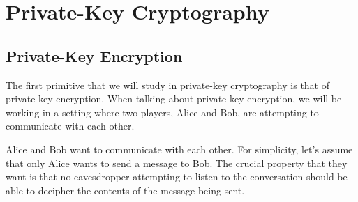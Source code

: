 \documentclass[12pt]{tufte-book}
\newcommand{\gen}{\mathsf{Gen}}
\begin{document}
%
%
%

\chapter{Private-Key Cryptography}
\section{Private-Key Encryption}
The first primitive that we will study in private-key cryptography is that of private-key encryption.
When talking about private-key encryption, we will be working in a setting where two players, Alice and Bob, are attempting to communicate with each other.

Alice and Bob want to communicate with each other.
For simplicity, let's assume that only Alice wants to send a message to Bob.
The crucial property that they want is that no eavesdropper attempting to listen to the conversation should be able to decipher the contents of the message being sent.

\end{document}
